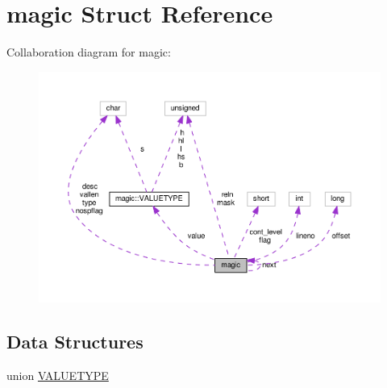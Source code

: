 \hypertarget{structmagic}{}\section{magic Struct Reference}
\label{structmagic}


Collaboration diagram for magic\+:
\nopagebreak
\begin{figure}[H]
\begin{center}
\leavevmode
\includegraphics[width=350pt]{structmagic__coll__graph}
\end{center}
\end{figure}
\subsection*{Data Structures}
\begin{DoxyCompactItemize}
\item 
union \hyperlink{unionmagic_1_1VALUETYPE}{V\+A\+L\+U\+E\+T\+Y\+PE}
\end{DoxyCompactItemize}
